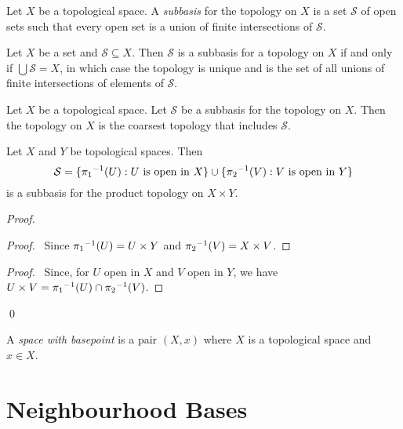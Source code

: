 \begin{df}[Subbasis]
Let $X$ be a topological space. A \emph{subbasis} for the topology on $X$ is a set $\mathcal{S}$ of open sets such that every open set is a union of finite intersections of $\mathcal{S}$.
\end{df}

\begin{prop}
Let $X$ be a set and $\mathcal{S} \subseteq X$. Then $\mathcal{S}$ is a subbasis for a topology on $X$ if and only if $\bigcup \mathcal{S} = X$, in which case the topology is unique and is the set of all unions of finite intersections of elements of $\mathcal{S}$.
\end{prop}

\begin{prop}
Let $X$ be a topological space.
Let $\mathcal{S}$ be a subbasis for the topology on $X$.
Then the topology on $X$ is the coarsest topology that includes $\mathcal{S}$.
\end{prop}


\begin{prop}
Let $X$ and $Y$ be topological spaces. Then
\[ \mathcal{S} = \{ {\pi_1}^{-1}(U) : U \text{ is open in } X \} \cup \{ {\pi_2}^{-1}(V) : V \text{ is open in } Y \} \]
is a subbasis for the product topology on $X \times Y$.
\end{prop}

\begin{proof}
\pf
{}
\begin{proof}
	\pf\ Since ${\pi_1}^{-1}(U) = U \times Y$ and ${\pi_2}^{-1}(V) = X \times V$.
\end{proof}
\begin{proof}
	\pf\ Since, for $U$ open in $X$ and $V$ open in $Y$, we have $U \times V = {\pi_1}^{-1}(U) \cap {\pi_2}^{-1}(V)$.
\end{proof}
\qed
\end{proof}

\begin{df}
A \emph{space with basepoint} is a pair $(X,x)$ where $X$ is a topological space and $x \in X$.
\end{df}

\section{Neighbourhood Bases}

